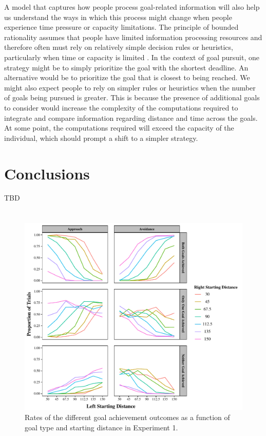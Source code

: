 \documentclass[a4paper,doc,natbib,donotrepeattitle]{apa6}
\begin{document}
A model that captures how people process goal-related information will also help us understand the ways in which this process might change when people experience time pressure or capacity limitations. The principle of bounded rationality assumes that people have limited information processing resources and therefore often must rely on relatively simple decision rules or heuristics, particularly when time or capacity is limited \citep{Simon1956,Gigerenzer1996}. In the context of goal pursuit, one strategy might be to simply prioritize the goal with the shortest deadline. An alternative would be to prioritize the goal that is closest to being reached. We might also expect people to rely on simpler rules or heuristics when the number of goals being pursued is greater. This is because the presence of additional goals to consider would increase the complexity of the computations required to integrate and compare information regarding distance and time across the goals. At some point, the computations required will exceed the capacity of the individual, which should prompt a shift to a simpler strategy.


\section{Conclusions}

TBD


\clearpage

\clearpage

\appendix
\section{}
\begin{figure}[h!]
\centering
\includegraphics[width=1\textwidth]{GoalAchievement-Distance.pdf}
\caption{\label{fig:GoalAch-Distance} Rates of the different goal achievement outcomes as a function of goal type and starting distance in Experiment 1.}
\end{figure}
\end{document}
